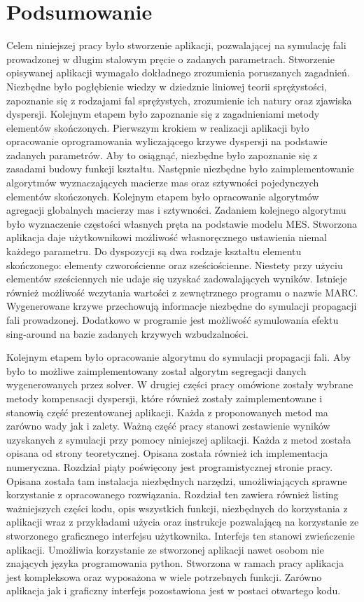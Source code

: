 \chapter{Podsumowanie}
\label{cha:podsumowanie}

Celem niniejszej pracy było stworzenie aplikacji, pozwalającej na symulację fali prowadzonej w długim stalowym pręcie o zadanych parametrach. Stworzenie opisywanej aplikacji wymagało dokładnego zrozumienia poruszanych zagadnień. Niezbędne było pogłębienie wiedzy w dziedznie liniowej teorii sprężystości, zapoznanie się z rodzajami fal sprężystych, zrozumienie ich natury oraz zjawiska dyspersji. Kolejnym etapem było zapoznanie się z zagadnieniami metody elementów skończonych. Pierwszym krokiem w realizacji aplikacji było opracowanie oprogramowania wyliczającego krzywe dyspersji na podstawie zadanych parametrów. Aby to osiągnąć, niezbędne było zapoznanie się z zasadami budowy funkcji kształtu. Następnie niezbędne było zaimplementowanie algorytmów wyznaczających macierze mas oraz sztywności pojedynczych elementów skończonych. Kolejnym etapem było opracowanie algorytmów agregacji globalnych macierzy mas i sztywności. Zadaniem kolejnego algorytmu było wyznaczenie częstości własnych pręta na podstawie modelu MES. Stworzona aplikacja daje użytkownikowi możliwość własnoręcznego ustawienia niemal każdego parametru. Do dyspozycji są dwa rodzaje kształtu elementu skończonego: elementy czworościenne oraz sześciościenne. Niestety przy użyciu elementów sześciennych nie udaje się uzyskać zadowalających wyników. Istnieje również możliwość wczytania wartości z zewnętrznego programu o nazwie MARC. Wygenerowane krzywe przechowują informacje niezbędne do symulacji propagacji fali prowadzonej. Dodatkowo w programie jest możliwość symulowania efektu sing-around na bazie zadanych krzywych wzbudzalności.

Kolejnym etapem było opracowanie algorytmu do symulacji propagacji fali. Aby było to możliwe zaimplementowany został algorytm segregacji danych wygenerowanych przez solver. W drugiej części pracy omówione zostały wybrane metody kompensacji dyspersji, które również zostały zaimplementowane i stanowią część prezentowanej aplikacji. Każda z proponowanych metod ma zarówno wady jak i zalety. Ważną część pracy stanowi zestawienie wyników uzyskanych z symulacji przy pomocy niniejszej aplikacji. Każda z metod została opisana od strony teoretycznej. Opisana została również ich implementacja numeryczna. Rozdział piąty poświęcony jest programistycznej stronie pracy. Opisana została tam instalacja niezbędnych narzędzi, umożliwiających sprawne korzystanie z opracowanego rozwiązania. Rozdział ten zawiera również listing ważniejszych części kodu, opis wszystkich funkcji, niezbędnych do korzystania z aplikacji wraz z przykładami użycia oraz instrukcje pozwalającą na korzystanie ze stworzonego graficznego interfejsu użytkownika. Interfejs ten stanowi zwieńczenie aplikacji. Umożliwia korzystanie ze stworzonej aplikacji nawet osobom nie znających języka programowania python. Stworzona w ramach pracy aplikacja jest kompleksowa oraz wyposażona w wiele potrzebnych funkcji. Zarówno aplikacja jak i graficzny interfejs pozostawiona jest w postaci otwartego kodu. 

